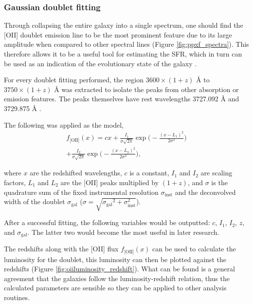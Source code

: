 \documentclass[12pt, twocolumn]{revtex4}    %
\begin{document}
\subsubsection{Gaussian doublet fitting}

Through collapsing the entire galaxy into a single spectrum, one should find the [OII] doublet emission line to be the most prominent feature due to its large amplitude when compared to other spectral lines (Figure \ref{fig:ppxf_spectra}). This therefore allows it to be a useful tool for estimating the SFR, which in turn can be used as an indication of the evolutionary state of the galaxy \citep{maddox_oxygen}.

For every doublet fitting performed, the region $3600\times(1+z)$ {\AA} to $3750\times(1+z)$ {\AA} was extracted to isolate the peaks from other absorption or emission features. The peaks themselves have rest wavelengths 3727.092 {\AA} and 3729.875 {\AA} \citep{sdss_lines}. 

The following was applied as the model,
\begin{multline}
f_{\text{[OII]}}(x) = cx + \frac{I_1}{\sigma \sqrt{2\pi}} \exp{\Bigg(-\frac{(x-L_1)^2}{2\sigma^2}\Bigg)} \\
+ \frac{I_2}{\sigma \sqrt{2\pi}} \exp{\Bigg(-\frac{(x-L_2)^2}{2\sigma^2}\Bigg)},
\label{eqn:doublet}
\end{multline} 

where $x$ are the redshifted wavelengths, ${c}$ is a constant, ${I_1}$ and ${I_2}$ are scaling factors, $L_1$ and $L_2$ are the [OII] peaks multiplied by $(1+{z})$, and $\sigma$ is the quadrature sum of the fixed instrumental resolution $\sigma_{\text{inst}}$ and the deconvolved width of the doublet $\sigma_{\text{gal}}$ ($\sigma=\sqrt{{\sigma_{\text{gal}}}^2 + \sigma_{\text{inst}}^2}$).



After a successful fitting, the following variables would be outputted: $c$, $I_1$, $I_2$, $z$, and $\sigma_{\text{gal}}$. The latter two would become the most useful in later research. 

The redshifts along with the [OII] flux $f_{\text{[OII]}}(x)$ can be used to calculate the luminosity for the doublet, this luminosity can then be plotted against the redshifts (Figure \ref{fig:oiiluminosity_redshift}). What can be found is a general agreement that the galaxies follow the luminosity-redshift relation, thus the calculated parameters are sensible so they can be applied to other analysis routines.
\end{document}
